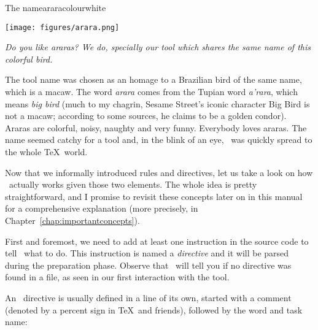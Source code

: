 \begin{messagebox}{The name}{araracolour}{\icok}{white}
\begin{minipage}{0.45\textwidth}
\vspace{.8em}
{\centering\texttt{[image: figures/arara.png]}\par}

\vspace{.7em}

\em Do you like araras? We do, specially our tool which shares the same name of this colorful bird.
\end{minipage}\hspace{1em}
\begin{minipage}{0.5\textwidth}
The tool name was chosen as an homage to a Brazilian bird of the same name, which is a macaw. The word \emph{arara} comes from the Tupian word \emph{a'rara}, which means \emph{big bird} (much to my chagrin, Sesame Street's iconic character Big Bird is not a macaw; according to some sources, he claims to be a golden condor). Araras are colorful, noisy, naughty and very funny. Everybody loves araras. The name seemed catchy for a tool and, in the blink of an eye, \arara\ was quickly spread to the whole \TeX\ world.
\end{minipage}
\end{messagebox}

Now that we informally introduced rules and directives, let us take a look on how \arara\ actually works given those two elements. The whole idea is pretty straightforward, and I promise to revisit these concepts later on in this manual for a comprehensive explanation (more precisely, in Chapter~\ref{chap:importantconcepts}).

First and foremost, we need to add at least one instruction in the source code to tell \arara\ what to do. This instruction is named a \emph{directive} and it will be parsed during the preparation phase. Observe that \arara\ will tell you if no directive was found in a file, as seen in our first interaction with the tool.

An \arara\ directive is usually defined in a line of its own, started with a comment (denoted by a percent sign in \TeX\ and friends), followed by the word  and task name:


